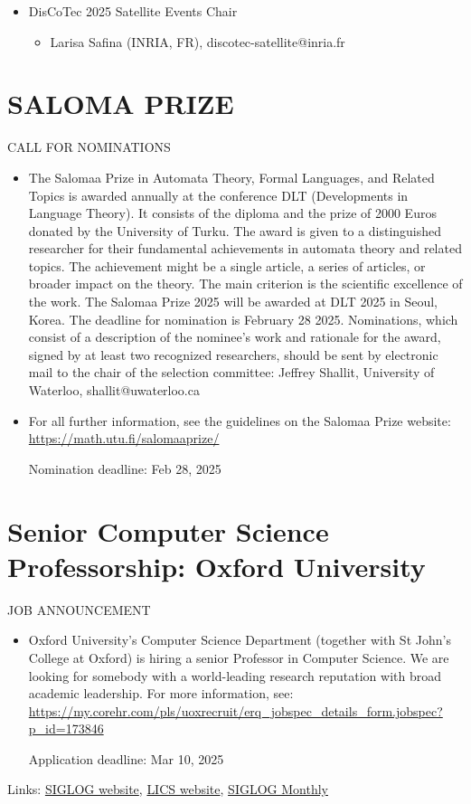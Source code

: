 \documentclass[prodmode,acmtecs]{acmsmall} %
\begin{document}
\begin{itemize}
\item  DisCoTec 2025 Satellite Events Chair 
 
\begin{itemize}\item  Larisa Safina (INRIA, FR), discotec-satellite@inria.fr
\end{itemize} 
\end{itemize}\section{SALOMA PRIZE }\label{SALOMAPRIZE}CALL FOR NOMINATIONS 

\begin{itemize}\item  The Salomaa Prize in Automata Theory, Formal Languages, and Related Topics is awarded annually at the conference DLT (Developments in Language Theory). It consists of the diploma and the prize of 2000 Euros donated by the University of Turku. The award is given to a distinguished researcher for their fundamental achievements in automata theory and related topics. The achievement might be a single article, a series of articles, or broader impact on the theory. The main criterion is the scientific excellence of the work. The Salomaa Prize 2025 will be awarded at DLT 2025 in Seoul, Korea. The deadline for nomination is February 28 2025. Nominations, which consist of a description of the nominee's work and rationale for the award, signed by at least two recognized researchers, should be sent by electronic mail to the chair of the selection committee: Jeffrey Shallit, University of Waterloo, shallit@uwaterloo.ca 
 
\item  For all further information, see the guidelines on the Salomaa Prize website: \href{https://math.utu.fi/salomaaprize/}{https://math.utu.fi/salomaaprize/} 
 
Nomination deadline: Feb 28, 2025 
 
\end{itemize}\section{Senior Computer Science Professorship: Oxford University}\label{SeniorComputerScienceProfessorship}JOB ANNOUNCEMENT 

\begin{itemize}\item  Oxford University’s Computer Science Department (together with St John's College at Oxford) is hiring a senior Professor in Computer Science. We are looking for somebody with a world-leading research reputation with broad academic leadership. For more information, see: \href{https://my.corehr.com/pls/uoxrecruit/erq_jobspec_details_form.jobspec?p_id=173846}{https://my.corehr.com/pls/uoxrecruit/erq\_jobspec\_details\_form.jobspec?p\_id=173846} 
 
Application deadline: Mar 10, 2025 
 
\end{itemize}


\bigskip Links: \href{http://siglog.org/}{SIGLOG website}, \href{https://lics.siglog.org}{LICS website}, \href{https://lics.siglog.org/newsletters/}{SIGLOG Monthly}
\end{document}
